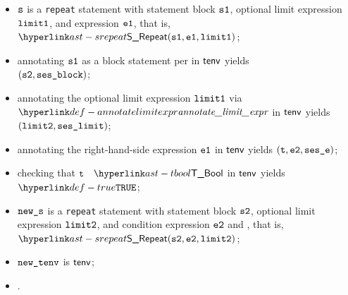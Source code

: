 \ProseParagraph
\AllApply
\begin{itemize}
  \item $\vs$ is a \texttt{repeat} statement with statement block $\vsone$,
        optional limit expression $\vlimitone$, and expression $\veone$, that is, $\SRepeat(\vsone, \veone, \vlimitone)$;
  \item annotating $\vsone$ as a block statement per  in $\tenv$ yields \\
        $(\vstwo, \vsesblock)$\ProseOrTypeError;
  \item annotating the optional limit expression $\vlimitone$ via $\annotatelimitexpr$ in $\tenv$ yields $(\vlimittwo, \vseslimit)$\ProseOrTypeError;
  \item annotating the right-hand-side expression $\veone$ in $\tenv$ yields $(\vt, \vetwo, \vsese)$\ProseOrTypeError;
  \item checking that $\vt$ \typesatisfies\ $\TBool$ in $\tenv$ yields $\True$\ProseOrTypeError;
  \item $\news$ is a \texttt{repeat} statement with statement block $\vstwo$, optional limit expression $\vlimittwo$,
        and condition expression $\vetwo$ and , that is, $\SRepeat(\vstwo, \vetwo, \vlimittwo)$;
  \item $\newtenv$ is $\tenv$;
  \item {}.
\end{itemize}
\FormallyParagraph
\begin{mathpar}
\end{mathpar}

